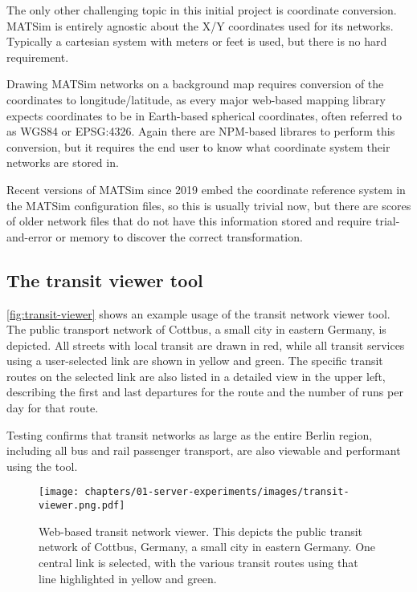 The only other challenging topic in this initial project is coordinate conversion. MATSim is entirely agnostic about the X/Y coordinates used for its networks. Typically a cartesian system with meters or feet is used, but there is no hard requirement.

Drawing MATSim networks on a background map requires conversion of the coordinates to longitude/latitude, as every major web-based mapping library expects coordinates to be in Earth-based spherical coordinates, often referred to as WGS84 or EPSG:4326. Again there are NPM-based librares to perform this conversion, but it requires the end user to know what coordinate system their networks are stored in.

Recent versions of MATSim since 2019 embed the coordinate reference system in the MATSim configuration files, so this is usually trivial now, but there are scores of older network files that do not have this information stored and require trial-and-error or memory to discover the correct transformation.

\hypertarget{server-experiments-transit-result}{%
\subsection{The transit viewer tool}
\label{server-experiments-tool-transit}}

\autoref{fig:transit-viewer} shows an example usage of the transit network viewer tool. The public transport network of Cottbus, a small city in eastern Germany, is depicted. All streets with local transit are drawn in red, while all transit services using a user-selected link are shown in yellow and green. The specific transit routes on the selected link are also listed in a detailed view in the upper left, describing the first and last departures for the route and the number of runs per day for that route.

Testing confirms that transit networks as large as the entire Berlin region, including all bus and rail passenger transport, are also viewable and performant using the tool.

\begin{figure}[!ht]
  \texttt{[image: chapters/01-server-experiments/images/transit-viewer.png.pdf]}
  \caption[Web-based transit network viewer]{Web-based transit network viewer. This depicts the public transit network of Cottbus, Germany, a small city in eastern Germany. One central link is selected, with the various transit routes using that line highlighted in yellow and green.}
  \label{fig:transit-viewer}
\end{figure}

